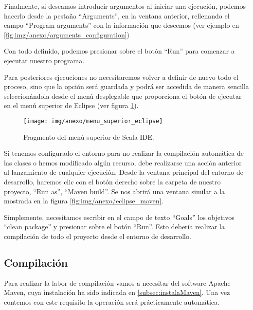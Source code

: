 

Finalmente, si deseamos introducir argumentos al iniciar una ejecución, podemos hacerlo desde la pestaña ``Arguments'', en la ventana anterior, rellenando el campo ``Program arguments'' con la información que deseemos (ver ejemplo en \ref{fig:img/anexo/arguments_configuration})



Con todo definido, podemos presionar sobre el botón ``Run'' para comenzar a ejecutar nuestro programa.

Para posteriores ejecuciones no necesitaremos volver a definir de nuevo todo el proceso, sino que la opción será guardada y podrá ser accedida de manera sencilla seleccionándola desde el menú desplegable que proporciona el botón de ejecutar en el menú superior de Eclipse (ver figura \ref{fig:img/anexo/menu_superior_eclipse}).

	\begin{figure}[!h]
		\centering
		\texttt{[image: img/anexo/menu\_superior\_eclipse]}
		\caption{Fragmento del menú superior de Scala IDE.}\label{fig:img/anexo/menu_superior_eclipse}
	\end{figure}
	
Si tenemos configurado el entorno para no realizar la compilación automática de las clases o hemos modificado algún recurso, debe realizarse una acción anterior al lanzamiento de cualquier ejecución. Desde la ventana principal del entorno de desarrollo, haremos clic con el botón derecho sobre la carpeta de nuestro proyecto, ``Run as'', ``Maven build''. Se nos abrirá una ventana similar a la mostrada en la figura \ref{fig:img/anexo/eclipse_maven}.
	
	
Simplemente, necesitamos escribir en el campo de texto ``Goals'' los objetivos ``clean package'' y presionar sobre el botón ``Run''. Esto debería realizar la compilación de todo el proyecto desde el entorno de desarrollo.

	
	\subsection{Compilación}\label{subsec:compilacion}

Para realizar la labor de compilación vamos a necesitar del software Apache Maven, cuya instalación ha sido indicada en \ref{subsec:instalaMaven}. Una vez contemos con este requisito la operación será prácticamente automática.

